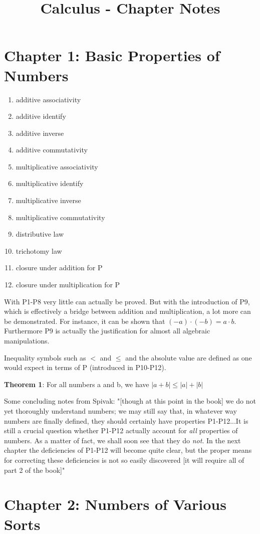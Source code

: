 \documentclass{article}
\begin{document}
\title{Calculus - Chapter Notes}
\author{}
\date{}
\maketitle

\section{Chapter 1: Basic Properties of Numbers}

\begin{enumerate}
	\item additive associativity
	\item additive identify
	\item additive inverse
	\item additive commutativity
	\item multiplicative associativity
	\item multiplicative identify
	\item multiplicative inverse
	\item multiplicative commutativity
	\item distributive law
	\item trichotomy law
	\item closure under addition for P
	\item closure under multiplication for P
\end{enumerate}

\begin{flushleft}
With P1-P8 very little can actually be proved. But with the introduction of P9, which is effectively a bridge between addition and multiplication, a lot more can be demonstrated. For instance, it can be shown that $(-a) \cdot (-b) = a \cdot b$. Furthermore P9 is actually the justification for almost all algebraic manipulations.
\end{flushleft}

\begin{flushleft}
Inequality symbols such as $<$ and $\leq$ and the absolute value are defined as one would expect in terms of P (introduced in P10-P12).
\end{flushleft}

\textbf{Theorem 1}: For all numbers a and b, we have $ |a+b| \leq |a|+|b| $

\begin{flushleft}
Some concluding notes from Spivak: "[though at this point in the book] we do not yet thoroughly understand numbers; we may still say that, in whatever way numbers are finally defined, they should certainly have properties P1-P12...It is still a crucial question whether P1-P12 actually account for \textit{all} properties of numbers. As a matter of fact, we shall soon see that they do \textit{not}. In the next chapter the deficiencies of P1-P12 will become quite clear, but the proper means for correcting these deficiencies is not so easily discovered [it will require all of part 2 of the book]"
\end{flushleft}

\section{Chapter 2: Numbers of Various Sorts}
\end{document}
